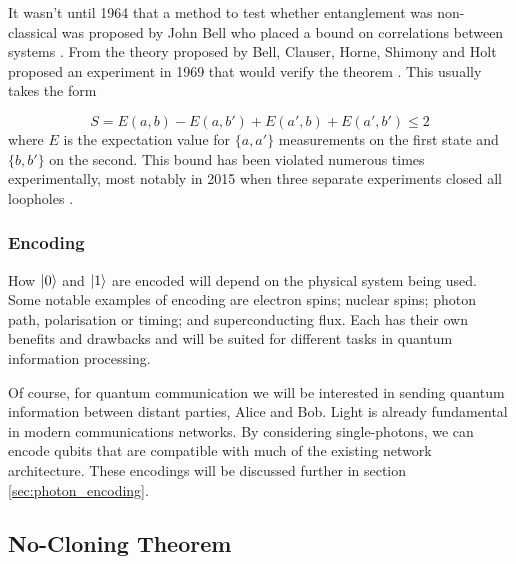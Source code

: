 It wasn't until 1964 that a method to test whether entanglement was non-classical was proposed by John Bell who placed a bound on correlations between systems \cite{Bell1964Einstein}. From the theory proposed by Bell, Clauser, Horne, Shimony and Holt proposed an experiment in 1969 that would verify the theorem \cite{CHSH}. This usually takes the form

\begin{equation}
	S = E(a,b) - E(a, b') + E(a',b) + E(a',b') \le 2
\end{equation}
where $E$ is the expectation value for $\{a,a'\}$ measurements on the first state and $\{b,b'\}$ on the second. This bound has been violated numerous times experimentally, most notably in 2015 when three separate experiments closed all loopholes \cite{Giustina2015, shalm2015, hensen2015}.

\subsubsection{Encoding}

How $\ket{0}$ and $\ket{1}$ are encoded will depend on the physical system being used. Some notable examples of encoding are electron spins; nuclear spins; photon path, polarisation or timing; and superconducting flux. Each has their own benefits and drawbacks and will be suited for different tasks in quantum information processing. 

Of course, for quantum communication we will be interested in sending quantum information between distant parties, Alice and Bob. Light is already fundamental in modern communications networks. By considering single-photons, we can encode qubits that are compatible with much of the existing network architecture. These encodings will be discussed further in section \ref{sec:photon_encoding}.




\subsection{No-Cloning Theorem}

